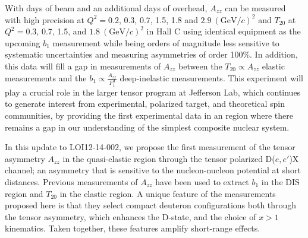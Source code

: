 With \productiondays days of beam and an additional \overheaddays days of overhead, $A_{zz}$ can be measured with high precision at $Q^2=0.2$, 0.3, 0.7, 1.5, 1.8 and $2.9~(\mathrm{GeV}/c)^2$ and $T_{20}$ at $Q^2=0.3$, 0.7, 1.5, and $1.8~(\mathrm{GeV}/c)^2$ in Hall C using identical equipment as the upcoming $b_1$ measurement while being orders of magnitude less sensitive to systematic uncertainties and measuring asymmetries of order 100\%. In addition, this data will fill a gap in measurements of $A_{zz}$ between the $T_{20}\propto A_{zz}$ elastic measurements and the $b_1\propto \frac{A_{zz}}{F_1^d}$ deep-inelastic measurements. This experiment will play a crucial role in the larger tensor program at Jefferson Lab, which continues to generate interest from experimental, polarized target, and theoretical spin communities, by providing the first experimental data in an region where there remains a gap in our understanding of the simplest composite nuclear system.

\iffalse
In this update to LOI12-14-002, we propose the first measurement of the tensor asymmetry $A_{zz}$ in the quasi-elastic region through the tensor polarized D($e,e'$)X channel; an asymmetry that is sensitive to the nucleon-nucleon potential 
at short distances. 
Previous measurements of $A_{zz}$ have been used to extract $b_1$ in the DIS region and $T_{20}$ in the elastic region. A unique feature of the measurements proposed here is that they select compact deuteron configurations both through the tensor asymmetry, which enhances the D-state, and the choice of $x>1$ kinematics. Taken together, these features amplify short-range effects.

